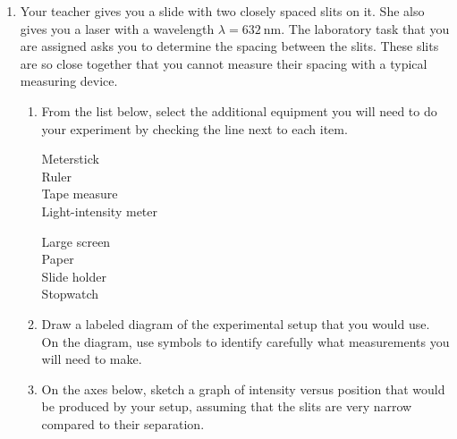 \documentclass{../../../oss-classkick}
\begin{document}
\begin{enumerate}[leftmargin=15pt]
  
\item Your teacher gives you a slide with two closely spaced slits on it. She
  also gives you a laser with a wavelength $\lambda=\SI{632}{\nano\metre}$. The
  laboratory task that you are assigned asks you to determine the spacing
  between the slits. These slits are so close together that you cannot measure
  their spacing with a typical measuring device.
  \begin{enumerate}[noitemsep]
  \item From the list below, select the additional equipment you will need to
    do your experiment by checking the line next to each item.
    \begin{multicols}{3}
      \underline{\hspace{.3in}} Meterstick\\
      \underline{\hspace{.3in}} Ruler\\
      \underline{\hspace{.3in}} Tape measure\\
      \underline{\hspace{.3in}} Light-intensity meter\\
      \columnbreak
      
      \underline{\hspace{.3in}} Large screen\\
      \underline{\hspace{.3in}} Paper\\
      \underline{\hspace{.3in}} Slide holder\\
      \underline{\hspace{.3in}} Stopwatch
    \end{multicols}
  \item Draw a labeled diagram of the experimental setup that you would use. On
    the diagram, use symbols to identify carefully what measurements you will
    need to make.
    \begin{center}
    \end{center}
  \item On the axes below, sketch a graph of intensity versus position that
    would be produced by your setup, assuming that the slits are very narrow
    compared to their separation.
  \end{enumerate}
  \newpage
  

\end{enumerate}
\end{document}
